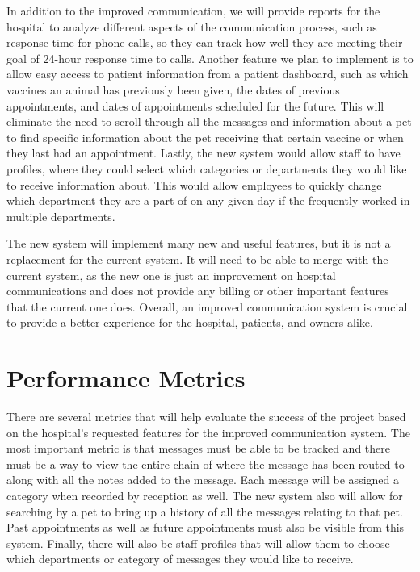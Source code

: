 \documentclass[letterpaper,10pt,draftclsnofoot,onecolumn]{article}
\begin{document}
In addition to the improved communication, we will provide reports for the hospital to analyze different aspects of the communication process, such as response time for phone calls, so they can track how well they are meeting their goal of 24-hour response time to calls. Another feature we plan to implement is to allow easy access to patient information from a patient dashboard, such as which vaccines an animal has previously been given, the dates of previous appointments, and dates of appointments scheduled for the future. This will eliminate the need to scroll through all the messages and information about a pet to find specific information about the pet receiving that certain vaccine or when they last had an appointment. Lastly, the new system would allow staff to have profiles, where they could select which categories or departments they would like to receive information about. This would allow employees to quickly change which department they are a part of on any given day if the frequently worked in multiple departments. 

The new system will implement many new and useful features, but it is not a replacement for the current system. It will need to be able to merge with the current system, as the new one is just an improvement on hospital communications and does not provide any billing or other important features that the current one does. Overall, an improved communication system is crucial to provide a better experience for the hospital, patients, and owners alike.



\section{Performance Metrics}

There are several metrics that will help evaluate the success of the project based on the hospital’s requested features for the improved communication system. The most important metric is that messages must be able to be tracked and there must be a way to view the entire chain of where the message has been routed to along with all the notes added to the message. Each message will be assigned a category when recorded by reception as well. The new system also will allow for searching by a pet to bring up a history of all the messages relating to that pet. Past appointments as well as future appointments must also be visible from this system. Finally, there will also be staff profiles that will allow them to choose which departments or category of messages they would like to receive.  
\end{document}
